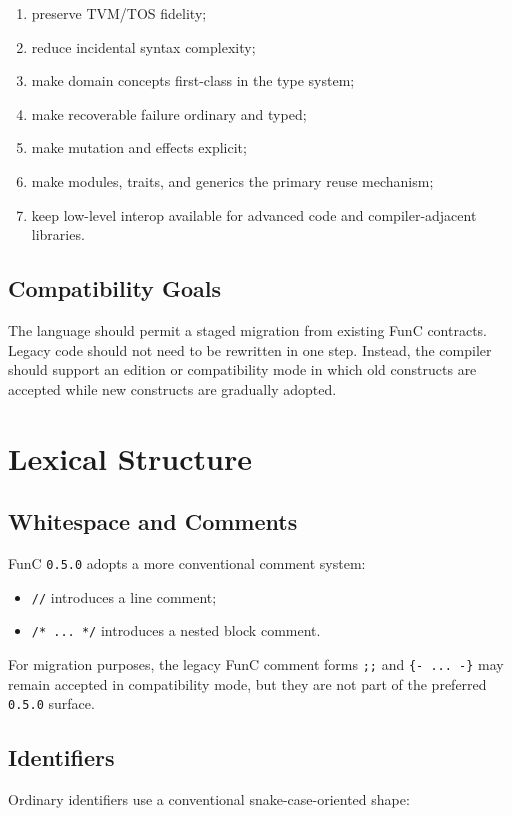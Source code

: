\documentclass[12pt,oneside]{article}
\begin{document}
\begin{enumerate}
\item preserve TVM/TOS fidelity;
\item reduce incidental syntax complexity;
\item make domain concepts first-class in the type system;
\item make recoverable failure ordinary and typed;
\item make mutation and effects explicit;
\item make modules, traits, and generics the primary reuse mechanism;
\item keep low-level interop available for advanced code and compiler-adjacent
libraries.
\end{enumerate}

\subsection{Compatibility Goals}
The language should permit a staged migration from existing FunC contracts.
Legacy code should not need to be rewritten in one step. Instead, the compiler
should support an edition or compatibility mode in which old constructs are
accepted while new constructs are gradually adopted.

\section{Lexical Structure}
\subsection{Whitespace and Comments}
FunC \verb|0.5.0| adopts a more conventional comment system:

\begin{itemize}
\item \verb|//| introduces a line comment;
\item \verb|/* ... */| introduces a nested block comment.
\end{itemize}

For migration purposes, the legacy FunC comment forms \verb|;;| and
\verb|{- ... -}| may remain accepted in compatibility mode, but they are not
part of the preferred \verb|0.5.0| surface.

\subsection{Identifiers}
Ordinary identifiers use a conventional snake-case-oriented shape:
\end{document}
